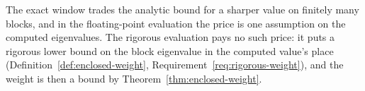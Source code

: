 
The exact window trades the analytic bound for a sharper value on finitely
many blocks, and in the floating-point evaluation the price is one assumption
on the computed eigenvalues. The rigorous evaluation pays no such price: it
puts a rigorous lower bound on the block eigenvalue in the computed value's
place (Definition~\ref{def:enclosed-weight},
Requirement~\ref{req:rigorous-weight}), and the weight is then a bound by
Theorem~\ref{thm:enclosed-weight}.

